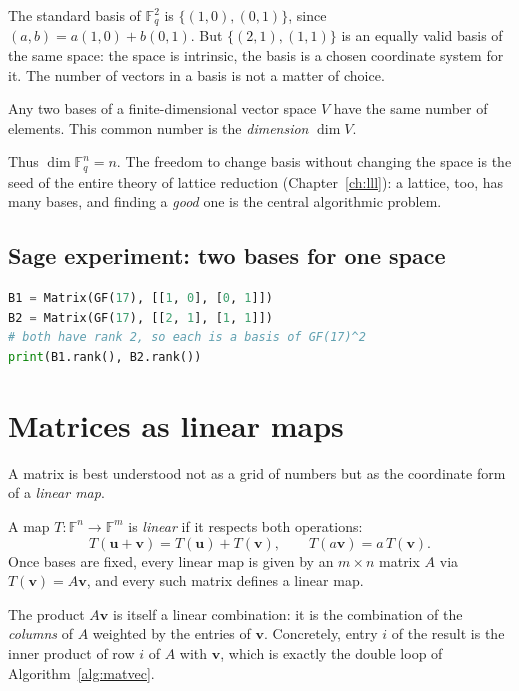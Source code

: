 The standard basis of $\mathbb{F}_q^2$ is $\{(1,0),(0,1)\}$, since $(a,b)=a(1,0)+b(0,1)$. But $\{(2,1),(1,1)\}$ is an equally valid basis of the same space: the space is intrinsic, the basis is a chosen coordinate system for it. The number of vectors in a basis is not a matter of choice.

\begin{theorem}
Any two bases of a finite-dimensional vector space $V$ have the same number of elements. This common number is the \emph{dimension} $\dim V$.
\end{theorem}

Thus $\dim \mathbb{F}_q^n = n$. The freedom to change basis without changing the space is the seed of the entire theory of lattice reduction (Chapter~\ref{ch:lll}): a lattice, too, has many bases, and finding a \emph{good} one is the central algorithmic problem.

\subsection{Sage experiment: two bases for one space}

\begin{lstlisting}[language=Python]
B1 = Matrix(GF(17), [[1, 0], [0, 1]])
B2 = Matrix(GF(17), [[2, 1], [1, 1]])
# both have rank 2, so each is a basis of GF(17)^2
print(B1.rank(), B2.rank())
\end{lstlisting}

\section{Matrices as linear maps}
A matrix is best understood not as a grid of numbers but as the coordinate form of a \emph{linear map}.

\begin{definition}
A map $T\colon \mathbb{F}^n \to \mathbb{F}^m$ is \emph{linear} if it respects both operations:
\[
T(\mathbf{u}+\mathbf{v}) = T(\mathbf{u})+T(\mathbf{v}),\qquad T(a\mathbf{v}) = a\,T(\mathbf{v}).
\]
Once bases are fixed, every linear map is given by an $m\times n$ matrix $A$ via $T(\mathbf{v})=A\mathbf{v}$, and every such matrix defines a linear map.
\end{definition}

The product $A\mathbf{v}$ is itself a linear combination: it is the combination of the \emph{columns} of $A$ weighted by the entries of $\mathbf{v}$. Concretely, entry $i$ of the result is the inner product of row $i$ of $A$ with $\mathbf{v}$, which is exactly the double loop of Algorithm~\ref{alg:matvec}.

